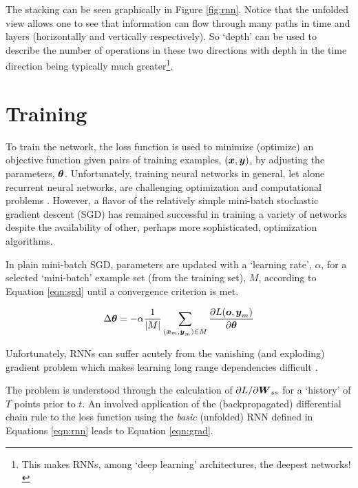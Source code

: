 The stacking can be seen graphically in Figure \ref{fig:rnn}. Notice that the unfolded view allows one to see that information can flow through many paths in time and layers (horizontally and vertically respectively). So `depth' can be used to describe the number of operations in these two directions with depth in the time direction being typically much greater\footnote{This makes RNNs, among `deep learning' architectures, the deepest networks!}.


\section{Training}


To train the network, the loss function is used to  minimize (optimize) an objective function given pairs of training examples, $(\boldsymbol{x},\boldsymbol{y})$, by adjusting the parameters, $\boldsymbol{\theta}$. Unfortunately, training neural networks in general, let alone recurrent neural networks, are challenging optimization and computational problems \cite{Blum1992}. However, a flavor of the relatively simple mini-batch stochastic gradient descent (SGD) has remained successful in training a variety of networks \cite{Bengio2012b} despite the availability of other, perhaps more sophisticated, optimization algorithms. %

In plain mini-batch SGD, parameters are updated with a `learning rate', $\alpha$, for a selected `mini-batch' example set (from the training set), $M$, according to Equation \ref{eqn:sgd} until a convergence criterion is met.

\begin{equation}
  \label{eqn:sgd}
   \Delta \vc{\theta} =
   -\alpha
   \frac{1}{|M|} \sum_{(\vc{x}_m,\vc{y}_m) \in M}
   \frac{\partial{L}(
     \vc{o}%
     ,\vc{y}_m)}
   {\partial{\vc{\theta}}}
\end{equation}

Unfortunately, RNNs can suffer acutely from the vanishing (and exploding) gradient problem which makes learning long range dependencies difficult \cite{Hochreiter,Bengio1994,Doya1992,Pascanu2013c}.

The problem is understood through the calculation of $\partial{L}/\partial{\ensuremath{\boldsymbol{W}}_{ss}}$ for a `history' of $T$ points prior to $t$.
%
An involved application of the (backpropagated) differential chain rule to the loss function using the \emph{basic} (unfolded) RNN defined in Equations \ref{eqn:rnn} leads to Equation \ref{eqn:grad}.

